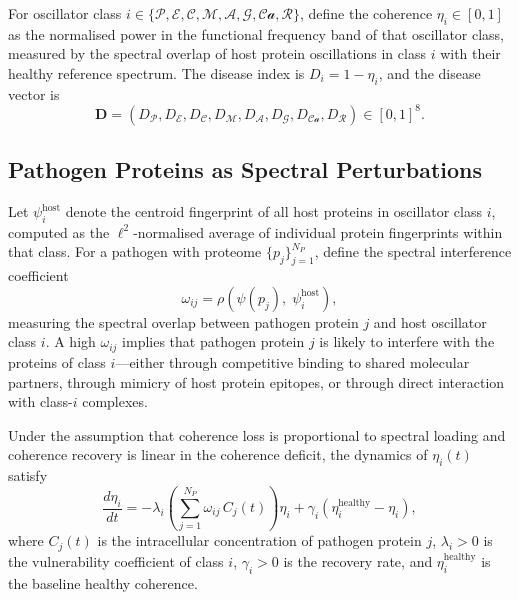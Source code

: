 \begin{definition}
\label{ps:def:disease_vector}
For oscillator class
$i \in \{\mathcal{P}, \mathcal{E}, \mathcal{C}, \mathcal{M}, \mathcal{A},
\mathcal{G}, \mathcal{Ca}, \mathcal{R}\}$, define the coherence
$\eta_i \in [0, 1]$ as the normalised power in the functional frequency band
of that oscillator class, measured by the spectral overlap of host protein
oscillations in class $i$ with their healthy reference spectrum. The disease
index is $D_i = 1 - \eta_i$, and the disease vector is
\begin{equation}
  \mathbf{D} = (D_\mathcal{P}, D_\mathcal{E}, D_\mathcal{C}, D_\mathcal{M},
    D_\mathcal{A}, D_\mathcal{G}, D_{\mathcal{Ca}}, D_\mathcal{R}) \in [0,1]^8.
  \label{ps:eq:disease_vector}
\end{equation}
\end{definition}

\subsection{Pathogen Proteins as Spectral Perturbations}

Let $\psi_i^{\text{host}}$ denote the centroid fingerprint of all host proteins
in oscillator class $i$, computed as the $\ell^2$-normalised average of
individual protein fingerprints within that class. For a pathogen with proteome
$\{p_j\}_{j=1}^{N_P}$, define the spectral interference coefficient
\begin{equation}
  \omega_{ij} = \rho\!\left(\psi(p_j),\; \psi_i^{\text{host}}\right),
  \label{ps:eq:omega}
\end{equation}
measuring the spectral overlap between pathogen protein $j$ and host oscillator
class $i$. A high $\omega_{ij}$ implies that pathogen protein $j$ is likely to
interfere with the proteins of class $i$---either through competitive binding to
shared molecular partners, through mimicry of host protein epitopes, or through
direct interaction with class-$i$ complexes.

\begin{proposition}
\label{ps:prop:coherence_decay}
Under the assumption that coherence loss is proportional to spectral loading
and coherence recovery is linear in the coherence deficit, the dynamics of
$\eta_i(t)$ satisfy
\begin{equation}
  \frac{d\eta_i}{dt} = -\lambda_i \!\left(\sum_{j=1}^{N_P} \omega_{ij}\, C_j(t)\right) \eta_i
    + \gamma_i \!\left(\eta_i^{\text{healthy}} - \eta_i\right),
  \label{ps:eq:coherence_decay}
\end{equation}
where $C_j(t)$ is the intracellular concentration of pathogen protein $j$,
$\lambda_i > 0$ is the vulnerability coefficient of class $i$, $\gamma_i > 0$
is the recovery rate, and $\eta_i^{\text{healthy}}$ is the baseline healthy
coherence.
\end{proposition}

